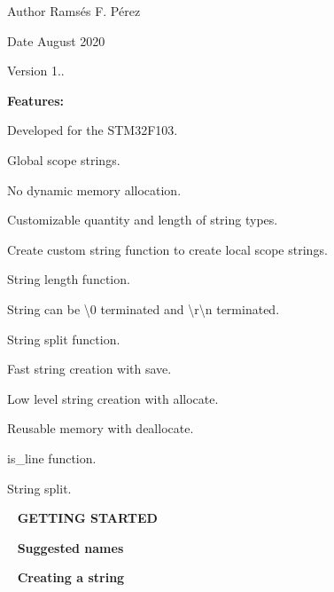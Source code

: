\begin{DoxyAuthor}{Author}
Ramsés F. Pérez 
\end{DoxyAuthor}
\begin{DoxyDate}{Date}
August 2020 
\end{DoxyDate}
\begin{DoxyVersion}{Version}
1..
\end{DoxyVersion}
{\bfseries{Features\+:}}


\begin{DoxyItemize}
\item Developed for the S\+T\+M32\+F103.
\item Global scope strings.
\item No dynamic memory allocation.
\item Customizable quantity and length of string types.
\item Create custom string function to create local scope strings.
\item String length function.
\item String can be \textbackslash{}0 terminated and \textbackslash{}r\textbackslash{}n terminated.
\item String split function.
\item Fast string creation with save.
\item Low level string creation with allocate.
\item Reusable memory with deallocate.
\item is\+\_\+line function.
\item String split.
\end{DoxyItemize}

~\newline
{\bfseries{G\+E\+T\+T\+I\+NG S\+T\+A\+R\+T\+ED}}

~\newline
{\bfseries{Suggested names}} ~\newline
 
\begin{DoxyCode}{0}
\end{DoxyCode}


~\newline
{\bfseries{Creating a string}} ~\newline
 
\begin{DoxyCode}{0}
\DoxyCodeLine{\}}
\DoxyCodeLine{\textcolor{keywordflow}{else}\{}
\DoxyCodeLine{\}}
\end{DoxyCode}


